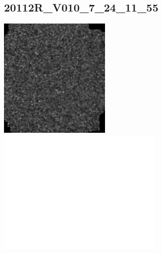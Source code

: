 \documentclass[11pt]{article}
\begin{document}
\subsection{20112R\_V010\_7\_24\_11\_55}
\includegraphics[width=0.40\textwidth, valign=m]{referenceframes/aoslo/20112R_V010_7_24_11_55_dwt_nostim_gamscaled_bandfilt_refframe.jpg}
\includegraphics[width=0.60\textwidth, valign=m]{eyepositiontraces/aoslo/20112R_V010_7_24_11_55.jpg}\\
\end{document}
